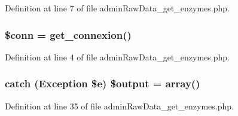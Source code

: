 Definition at line 7 of file admin\-Raw\-Data\-\_\-get\-\_\-enzymes.\-php.

\hypertarget{admin_batch_2admin_raw_data__get__enzymes_8php_aa8a5a87b9c1a6a0819b88447cbe41877}{
\subsubsection[{\$conn}]{\setlength{\rightskip}{0pt plus 5cm}\$conn = {\bf get\-\_\-connexion}()}}\label{admin_batch_2admin_raw_data__get__enzymes_8php_aa8a5a87b9c1a6a0819b88447cbe41877}


Definition at line 4 of file admin\-Raw\-Data\-\_\-get\-\_\-enzymes.\-php.

\hypertarget{admin_batch_2admin_raw_data__get__enzymes_8php_adeea971a3fd99fcce189bd638dacd58c}{
\subsubsection[{\$output}]{\setlength{\rightskip}{0pt plus 5cm}catch (Exception \$e) \$output = array()}}\label{admin_batch_2admin_raw_data__get__enzymes_8php_adeea971a3fd99fcce189bd638dacd58c}


Definition at line 35 of file admin\-Raw\-Data\-\_\-get\-\_\-enzymes.\-php.

